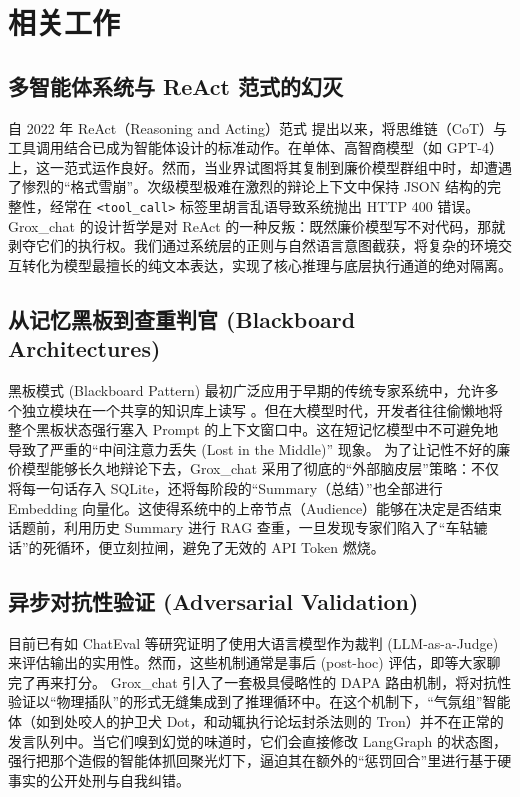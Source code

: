 \section{相关工作}
\label{sec:related}

\subsection{多智能体系统与 ReAct 范式的幻灭}
自 2022 年 ReAct（Reasoning and Acting）范式 \cite{yao2022react} 提出以来，将思维链（CoT）与工具调用结合已成为智能体设计的标准动作。在单体、高智商模型（如 GPT-4）上，这一范式运作良好。然而，当业界试图将其复制到廉价模型群组中时，却遭遇了惨烈的“格式雪崩”。次级模型极难在激烈的辩论上下文中保持 JSON 结构的完整性，经常在 \texttt{<tool\_call>} 标签里胡言乱语导致系统抛出 HTTP 400 错误。Grox\_chat 的设计哲学是对 ReAct 的一种反叛：既然廉价模型写不对代码，那就剥夺它们的执行权。我们通过系统层的正则与自然语言意图截获，将复杂的环境交互转化为模型最擅长的纯文本表达，实现了核心推理与底层执行通道的绝对隔离。

\subsection{从记忆黑板到查重判官 (Blackboard Architectures)}
黑板模式 (Blackboard Pattern) 最初广泛应用于早期的传统专家系统中，允许多个独立模块在一个共享的知识库上读写 \cite{nii1986blackboard}。但在大模型时代，开发者往往偷懒地将整个黑板状态强行塞入 Prompt 的上下文窗口中。这在短记忆模型中不可避免地导致了严重的“中间注意力丢失 (Lost in the Middle)” \cite{liu2023lost} 现象。
为了让记性不好的廉价模型能够长久地辩论下去，Grox\_chat 采用了彻底的“外部脑皮层”策略：不仅将每一句话存入 SQLite，还将每阶段的“Summary（总结）”也全部进行 Embedding 向量化。这使得系统中的上帝节点（Audience）能够在决定是否结束话题前，利用历史 Summary 进行 RAG 查重，一旦发现专家们陷入了“车轱辘话”的死循环，便立刻拉闸，避免了无效的 API Token 燃烧。

\subsection{异步对抗性验证 (Adversarial Validation)}
目前已有如 ChatEval \cite{zheng2023chateval} 等研究证明了使用大语言模型作为裁判 (LLM-as-a-Judge) 来评估输出的实用性。然而，这些机制通常是事后 (post-hoc) 评估，即等大家聊完了再来打分。
Grox\_chat 引入了一套极具侵略性的 DAPA 路由机制，将对抗性验证以“物理插队”的形式无缝集成到了推理循环中。在这个机制下，“气氛组”智能体（如到处咬人的护卫犬 Dot，和动辄执行论坛封杀法则的 Tron）并不在正常的发言队列中。当它们嗅到幻觉的味道时，它们会直接修改 LangGraph 的状态图，强行把那个造假的智能体抓回聚光灯下，逼迫其在额外的“惩罚回合”里进行基于硬事实的公开处刑与自我纠错。